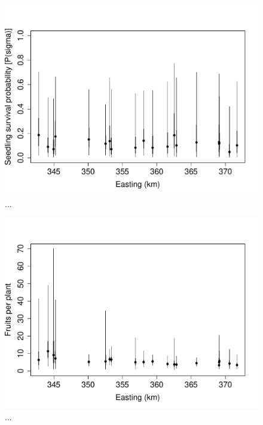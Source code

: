 \documentclass[12pt, oneside, titlepage]{article}   	%
\begin{document}
 \begin{figure}[h]
   \centering
       \includegraphics[page=1,width=1\textwidth]{../figures/spatial-sigma.pdf}  
    \caption{ ... }
 \label{fig:test}
\end{figure}

 \begin{figure}[h]
   \centering
       \includegraphics[page=1,width=1\textwidth]{../figures/spatial-fruitsPerPlant-allplots.pdf}  
    \caption{ ... }
 \label{fig:test}
\end{figure}
\end{document}
